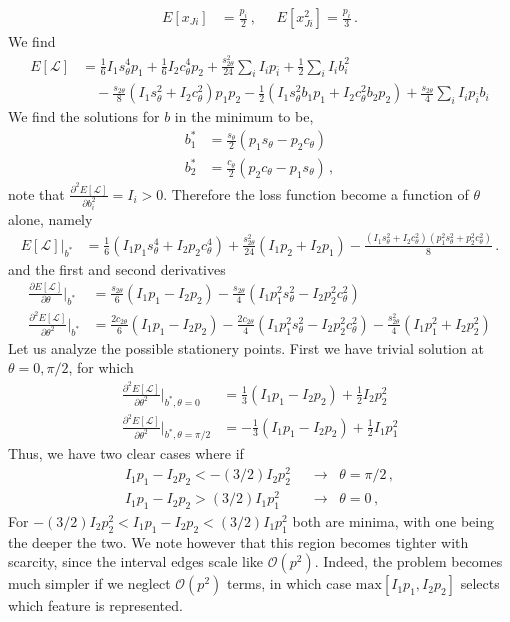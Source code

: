 \documentclass[a4paper]{article}
\begin{document}
\begin{align}
E[x_{Ji}] &= \frac{p_i}{2}\,, \;\;\;\;\;
E[x^2_{Ji}] = \frac{p_i}{3}\,.
\end{align}
We find
\begin{align}
E[\mathcal{L}] &= \frac{1}{6}I_1 s_\theta^4 p_1 + \frac{1}{6}I_2 c_\theta^4 p_2 
+ \frac{s_{2\theta}^2}{24}\sum_i I_i p_{\bar{i}} 
+ \frac{1}{2}\sum_i I_i b_i^2 \nonumber\\
&\quad - \frac{s_{2\theta}}{8}\left(I_1 s_\theta^2 + I_2 c_\theta^2\right)p_1 p_2 
- \frac{1}{2}\left(I_1 s_\theta^2 b_1 p_1 + I_2 c_\theta^2 b_2 p_2\right) 
+ \frac{s_{2\theta}}{4}\sum_i I_i p_{\bar i} b_i
\end{align}
We find the solutions for $b$ in the minimum to be,
\begin{align}
b_1^* &= \frac{s_\theta}{2}(p_1 s_\theta - p_2 c_\theta)\\
b_2^* &= \frac{c_\theta}{2}(p_2 c_\theta - p_1 s_\theta)\,,
\end{align}
note that $\frac{\partial^2 E[\mathcal{L}]}{\partial b_i^2}=I_i>0$. Therefore the loss function become a function of $\theta$ alone, namely
\begin{align}
E[\mathcal{L}]\big|_{b^*} &= \frac{1}{6}(I_1 p_1 s_\theta^4 + I_2 p_2 c_\theta^4) + \frac{s_{2\theta}^2}{24}(I_1 p_2 + I_2 p_1) - \frac{(I_1 s_\theta^2 + I_2 c_\theta^2)(p_1^2 s_\theta^2 + p_2^2 c_\theta^2)}{8}\,.
\end{align}
and the first and second derivatives
\begin{align}
\frac{\partial E[\mathcal{L}]}{\partial\theta}\Bigg|_{b^*} &= \frac{s_{2\theta}}{6}(I_1 p_1 - I_2 p_2) - \frac{s_{2\theta}}{4}(I_1 p_1^2 s_\theta^2 - I_2 p_2^2 c_\theta^2)
\\
\frac{\partial^2 E[\mathcal{L}]}{\partial\theta^2}\Bigg|_{b^*} &= \frac{2c_{2\theta}}{6}(I_1 p_1 - I_2 p_2) - \frac{2c_{2\theta}}{4}(I_1 p_1^2 s_\theta^2 - I_2 p_2^2 c_\theta^2) - \frac{s_{2\theta}^2}{4}(I_1 p_1^2 + I_2 p_2^2)
\end{align}
Let us analyze the possible stationery points. First we have trivial solution at $\theta=0,\pi/2$, for which
\begin{align}
\frac{\partial^2 E[\mathcal{L}]}{\partial\theta^2}\Bigg|_{b^*,\theta=0} &= \frac{1}{3}(I_1 p_1 - I_2 p_2) +\frac{1}{2}I_2 p_2^2
\\
\frac{\partial^2 E[\mathcal{L}]}{\partial\theta^2}\Bigg|_{b^*,\theta=\pi/2} &= -\frac{1}{3}(I_1 p_1 - I_2 p_2) +\frac{1}{2}I_1 p_1^2  
\end{align}
Thus, we have two clear cases where if
\begin{align}
I_1p_1- I_2 p_2 < -(3/2) I_2 p_2^2 \;\; &\to \;\; \theta=\pi/2\,,
\\
I_1p_1 - I_2 p_2 > (3/2) I_1 p_1^2 \;\; &\to \;\; \theta=0\,,
\end{align}
For $-(3/2) I_2 p_2^2<I_1p_1 - I_2 p_2 < (3/2) I_1 p_1^2$ both are minima, with one being the deeper the two. We note however that this region becomes tighter with scarcity, since the interval edges scale like $\mathcal{O}(p^2)$. Indeed, the problem becomes much simpler if we neglect $\mathcal{O}(p^2)$ terms, in which case $\text{max}[I_1 p_1,I_2 p_2]$ selects which feature is represented. 
\end{document}
